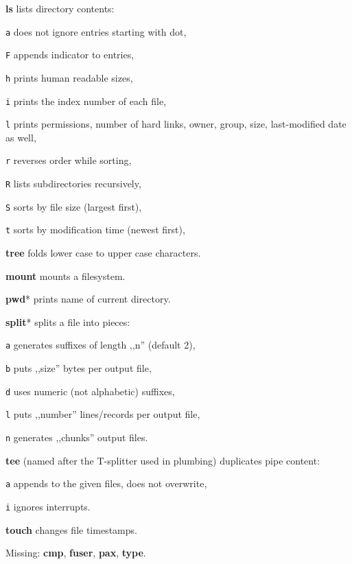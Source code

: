 \begin{enumx}
	\item [\cmd] \textbf{ls} lists directory contents:
	\item [\texttt{a}] does not ignore entries starting with dot, 
	\item [\texttt{F}] appends indicator to entries, 
	\item [\texttt{h}] prints human readable sizes, 
	\item [\texttt{i}] prints the index number of each file, 
	\item [\texttt{l}] prints permissions, number of hard links, owner, group, size, last-modified date as well, 
	\item [\texttt{r}] reverses order while sorting,
	\item [\texttt{R}] lists subdirectories recursively, 
	\item [\texttt{S}] sorts by file size (largest first), 
	\item [\texttt{t}] sorts by modification time (newest first), 
	\item [\cmd] \textbf{tree} folds lower case to upper case characters.
\end{enumx}

\begin{enumx}
	\item [\cmd] \textbf{mount} mounts a filesystem.
\end{enumx}

\begin{enumx}
	\item [\cmd] \textbf{pwd}* prints name of current directory.
\end{enumx}

\begin{enumx}
	\item [\cmd] \textbf{split}* splits a file into pieces:
	\item [\texttt{a}] generates suffixes of length ,,n'' (default 2),
	\item [\texttt{b}] puts ,,size'' bytes per output file,
	\item [\texttt{d}] uses numeric (not alphabetic) suffixes,
	\item [\texttt{l}] puts ,,number'' lines/records per output file,
	\item [\texttt{n}] generates ,,chunks'' output files.
\end{enumx}

\begin{enumx}
	\item [\cmd] \textbf{tee} (named after the T-splitter used in plumbing) duplicates pipe content:
	\item [\texttt{a}] appends to the given files, does not overwrite,
	\item [\texttt{i}] ignores interrupts.
\end{enumx}

\begin{enumx}
	\item [\cmd] \textbf{touch} changes file timestamps.
\end{enumx}

\begin{enumx}
	\item [\cmd] Missing: \textbf{cmp}, \textbf{fuser}, \textbf{pax}, \textbf{type}.
\end{enumx}
